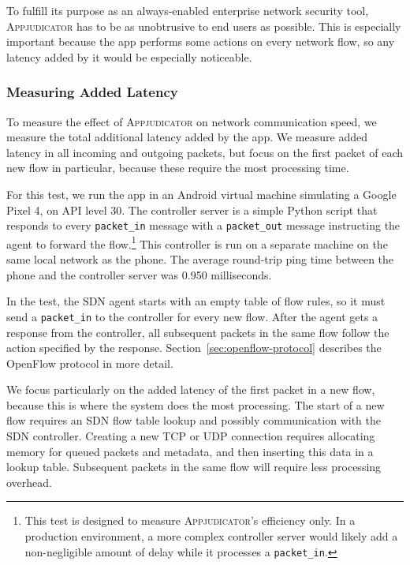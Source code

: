 To fulfill its purpose as an always-enabled enterprise network security tool,
\textsc{Appjudicator} has to be as unobtrusive to end users as possible. This is
especially important because the app performs some actions on every network
flow, so any latency added by it would be especially noticeable.

\subsubsection{Measuring Added Latency}
\label{sec:measuring-added-latency}

To measure the effect of \textsc{Appjudicator} on network communication speed,
we measure the total additional latency added by the app. We measure added
latency in all incoming and outgoing packets, but focus on the first packet of
each new flow in particular, because these require the most processing time.

For this test, we run the app in an Android virtual machine simulating a Google
Pixel 4, on API level 30. The controller server is a simple Python script that
responds to every \texttt{packet\_in} message with a \texttt{packet\_out}
message instructing the agent to forward the flow.\footnote{This test is
	designed to measure \textsc{Appjudicator}'s efficiency only. In a production
	environment, a more complex controller server would likely add a
	non-negligible amount of delay while it processes a \texttt{packet\_in}.}
This controller is run on a separate machine on the same local network as the
phone. The average round-trip ping time between the phone and the controller
server was 0.950 milliseconds.

In the test, the SDN agent starts with an empty table of flow rules, so it must
send a \texttt{packet\_in} to the controller for every new flow. After the agent
gets a response from the controller, all subsequent packets in the same flow
follow the action specified by the response.
Section~\ref{sec:openflow-protocol} describes the OpenFlow protocol in more
detail.

We focus particularly on the added latency of the first packet in a new flow,
because this is where the system does the most processing. The start of a new
flow requires an SDN flow table lookup and possibly communication with the SDN
controller. Creating a new TCP or UDP connection requires allocating memory for
queued packets and metadata, and then inserting this data in a lookup table.
Subsequent packets in the same flow will require less processing overhead.

